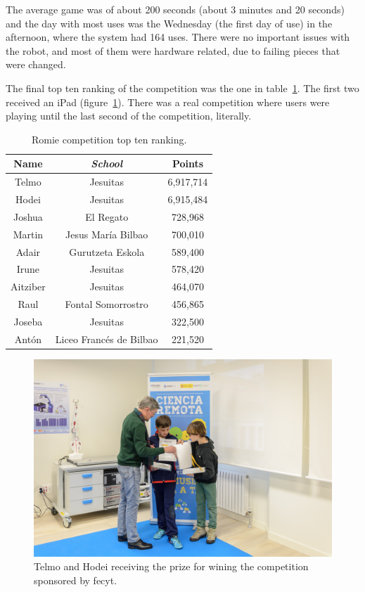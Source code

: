 The average game was of about 200 seconds (about 3 minutes and 20 seconds) and the day with most
uses was the Wednesday (the first day of use) in the afternoon, where the system had 164 uses. There
were no important issues with the robot, and most of them were hardware related, due to failing
pieces that were changed.

The final top ten ranking of the competition was the one in table~\ref{tab:ranking}. The first two
received an iPad (figure~\ref{fig:prizes}). There was a real competition where users were playing
until the last second of the competition, literally.

\begin{table}[ht]
	\centering
	\caption{Romie competition top ten ranking.}\label{tab:ranking}
	\begin{tabular}{ccc}
		\toprule
		\textbf{Name} & \emph{School} & \textbf{Points} \\
		\midrule
		Telmo		& Jesuitas					& 6,917,714	\\
		Hodei		& Jesuitas					& 6,915,484	\\
		Joshua		& El Regato					& 728,968	\\
		Martin		& Jesus María Bilbao		& 700,010	\\
		Adair		& Gurutzeta Eskola			& 589,400	\\
		Irune		& Jesuitas					& 578,420	\\
		Aitziber	& Jesuitas					& 464,070	\\
		Raul		& Fontal Somorrostro		& 456,865	\\
		Joseba		& Jesuitas					& 322,500	\\
		Antón		& Liceo Francés de Bilbao	& 221,520	\\
		\bottomrule
	\end{tabular}
\end{table}

\begin{figure}[ht]
	\centering
	\includegraphics[height=0.3\textheight]{fig/prizes.jpg}
	\caption{Telmo and Hodei receiving the prize for wining the competition sponsored by \acrshort{fecyt}.}
	\label{fig:prizes}
\end{figure}

